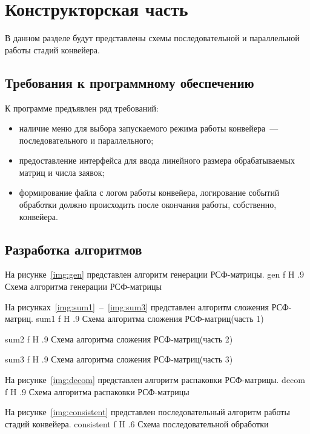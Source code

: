 \chapter{Конструкторская часть}
В данном разделе будут представлены схемы последовательной и параллельной работы стадий конвейера.

\section{Требования к программному обеспечению}
К программе предъявлен ряд требований:
\begin{itemize}
	\item наличие меню для выбора запускаемого режима работы конвейера~--- последовательного и параллельного;
	\item предоставление интерфейса для ввода линейного размера обрабатываемых матриц и числа заявок;
	\item формирование файла с логом работы конвейера, логирование событий обработки должно происходить после окончания работы, собственно, конвейера.
\end{itemize}

\section{Разработка алгоритмов}
\clearpage

На рисунке~\ref{img:gen} представлен алгоритм генерации РСФ-матрицы.
{gen}
{f}
{H}
{.9\textwidth}
{Схема алгоритма генерации РСФ-матрицы}

\clearpage

На рисунках~\ref{img:sum1}~--~\ref{img:sum3} представлен алгоритм сложения РСФ-матриц.
{sum1}
{f}
{H}
{.9\textwidth}
{Схема алгоритма сложения РСФ-матриц(часть 1)}

\clearpage

{sum2}
{f}
{H}
{.9\textwidth}
{Схема алгоритма сложения РСФ-матриц(часть 2)}

\clearpage

{sum3}
{f}
{H}
{.9\textwidth}
{Схема алгоритма сложения РСФ-матриц(часть 3)}

\clearpage

На рисунке~\ref{img:decom} представлен алгоритм распаковки РСФ-матрицы.
{decom}
{f}
{H}
{.9\textwidth}
{Схема алгоритма распаковки РСФ-матрицы}

\clearpage

На рисунке~\ref{img:consistent} представлен последовательный алгоритм работы стадий конвейера.
{consistent}
{f}
{H}
{.6\textwidth}
{Схема последовательной обработки}

